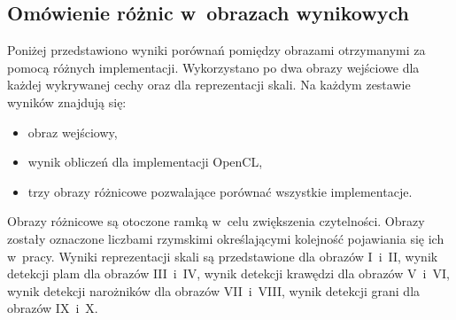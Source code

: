 \subsection{Omówienie różnic w~obrazach wynikowych}
\label{subsec:prezentacjaObrazowRoznicowych}

Poniżej przedstawiono wyniki porównań pomiędzy obrazami otrzymanymi za pomocą różnych implementacji. Wykorzystano po dwa obrazy wejściowe dla każdej wykrywanej cechy oraz dla reprezentacji skali. Na każdym zestawie wyników znajdują się:
\begin{itemize}
\item obraz wejściowy,
\item wynik obliczeń dla implementacji OpenCL,
\item trzy obrazy różnicowe pozwalające porównać wszystkie implementacje.
\end{itemize}

Obrazy różnicowe są otoczone ramką w~celu zwiększenia czytelności. Obrazy zostały oznaczone liczbami rzymskimi określającymi kolejność pojawiania się ich w~pracy. Wyniki reprezentacji skali są przedstawione dla obrazów I~i~II, wynik detekcji plam dla obrazów III~i~IV, wynik detekcji krawędzi dla obrazów V~i~VI, wynik detekcji narożników dla obrazów VII~i~VIII, wynik detekcji grani dla obrazów IX~i~X.

